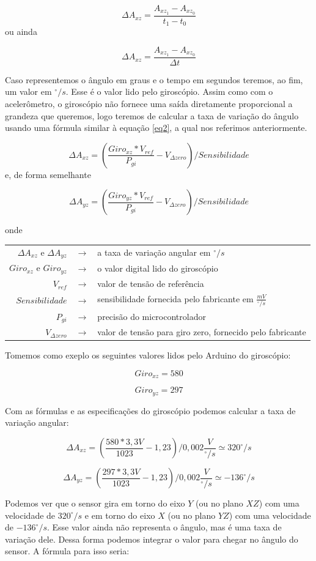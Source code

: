 \documentclass[a4paper,12pt]{article}
\begin{document}
$$\Delta A_{xz}=\frac{A_{xz_1}-A_{xz_0}}{t_1-t_0}$$ ou ainda

$$\Delta A_{xz}=\frac{A_{xz_1}-A_{xz_0}}{\Delta t}$$

Caso representemos o ângulo em graus e o tempo em segundos teremos, ao fim, um valor em $^\circ/s$. Esse é o valor lido pelo giroscópio. Assim como com o acelerômetro, o giroscópio não fornece uma saída diretamente proporcional a grandeza que queremos, logo teremos de calcular a taxa de variação do ângulo usando uma fórmula similar à equação \ref{eq2}, a qual nos referimos anteriormente.

$$\Delta A_{xz}=(\frac{Giro_{xz}\ast V_{ref}}{P_{gi}}-V_{\Delta zero})/Sensibilidade$$ e, de forma semelhante

$$\Delta A_{yz}=(\frac{Giro_{yz}\ast V_{ref}}{P_{gi}}-V_{\Delta zero})/Sensibilidade$$

\noindent\medskip
onde

\begin{center}
\begin{tabular}{rcl}
$\Delta A_{xz}$ e $\Delta A_{yz}$ & $\longrightarrow$ & a taxa de variação angular em $^\circ/s$ \\
$Giro_{xz}$ e $Giro_{yz}$ & $\longrightarrow$ & o valor digital lido do giroscópio \\
$V_{ref}$ & $\longrightarrow$ & valor de tensão de referência \\
$Sensibilidade$ & $\longrightarrow$ & sensibilidade fornecida pelo fabricante em $\frac{mV}{^\circ/s}$\\
$P_{gi}$ &$\longrightarrow$& precisão do microcontrolador \\
$V_{\Delta zero}$&$\longrightarrow$& valor de tensão para giro zero, fornecido pelo fabricante
\end{tabular}
\end{center}

Tomemos como exeplo os seguintes valores lidos pelo Arduino do giroscópio:

$$Giro_{xz}=580$$

$$Giro_{yz}=297$$

Com as fórmulas e as especificações do giroscópio podemos calcular a taxa de variação angular:

$$\Delta A_{xz}=(\frac{580\ast 3,3V}{1023}-1,23)/0,002\frac{V}{^\circ/s}\simeq 320^\circ/s$$

$$\Delta A_{yz}=(\frac{297\ast 3,3V}{1023}-1,23)/0,002\frac{V}{^\circ/s}\simeq -136^\circ/s$$

Podemos ver que o sensor gira em torno do eixo $Y$ (ou no plano $XZ$) com uma velocidade de $320^\circ/s$ e em torno do eixo $X$ (ou no plano $YZ$) com uma velocidade de $-136^\circ/s$. Esse valor ainda não representa o ângulo, mas é uma taxa de variação dele. Dessa forma podemos integrar o valor para chegar no ângulo do sensor. A fórmula para isso seria:
\end{document}
